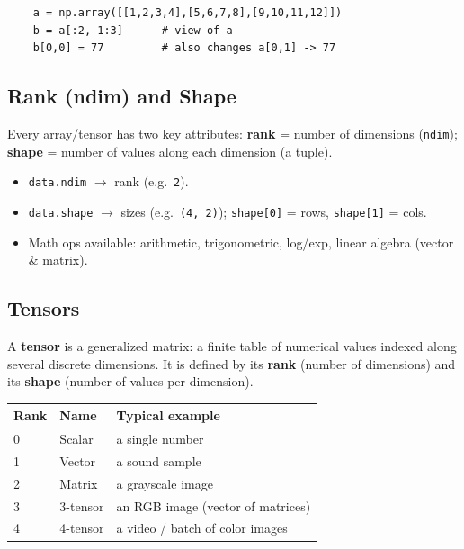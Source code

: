 \documentclass[10pt,a4paper]{article}
\begin{document}
	\begin{verbatim}
    a = np.array([[1,2,3,4],[5,6,7,8],[9,10,11,12]])
    b = a[:2, 1:3]      # view of a
    b[0,0] = 77         # also changes a[0,1] -> 77
\end{verbatim}

	\subsection{Rank (ndim) and Shape}

	\begin{definitionbox}
		Every array/tensor has two key attributes:
		\textbf{rank} = number of dimensions (\texttt{ndim}); \textbf{shape} = number of values along each dimension (a tuple).
	\end{definitionbox}

	\begin{itemize}[leftmargin=*]
		\item \texttt{data.ndim} $\rightarrow$ rank (e.g.\ \texttt{2}).
		\item \texttt{data.shape} $\rightarrow$ sizes (e.g.\ \texttt{(4, 2)}); \texttt{shape[0]} = rows, \texttt{shape[1]} = cols.
		\item Math ops available: arithmetic, trigonometric, log/exp, linear algebra (vector \& matrix).
	\end{itemize}

	\subsection{Tensors}

	\begin{definitionbox}
		A \textbf{tensor} is a generalized matrix: a finite table of numerical values indexed along several discrete dimensions. It is defined by its \textbf{rank} (number of dimensions) and its \textbf{shape} (number of values per dimension).
	\end{definitionbox}

	\begin{center}
		\begin{tabular}{lll}
			\toprule
			Rank & Name & Typical example \\
			\midrule
			0 & Scalar   & a single number \\
			1 & Vector   & a sound sample \\
			2 & Matrix   & a grayscale image \\
			3 & 3-tensor & an RGB image (vector of matrices) \\
			4 & 4-tensor & a video / batch of color images \\
			\bottomrule
		\end{tabular}
	\end{center}
\end{document}
